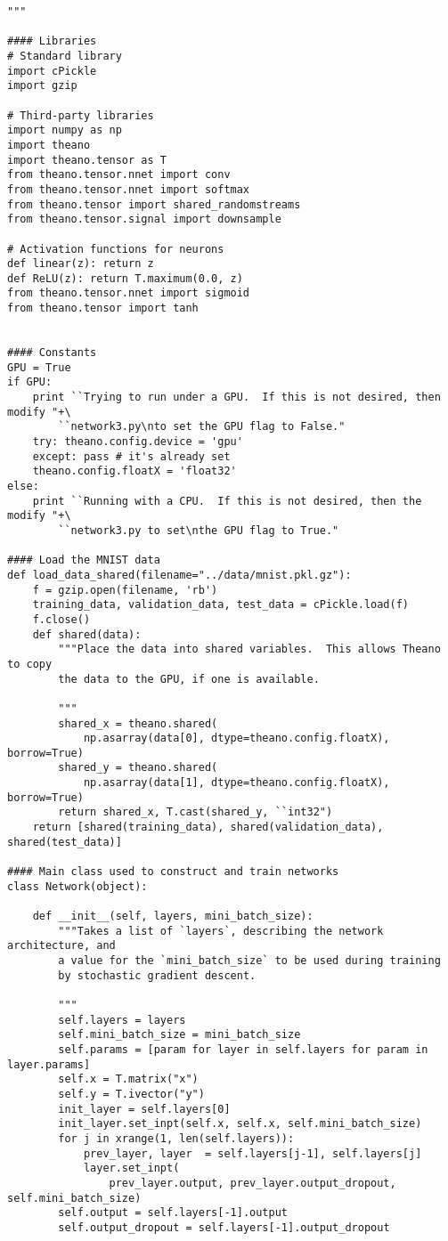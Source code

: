 \begin{lstlisting}
"""

#### Libraries
# Standard library
import cPickle
import gzip

# Third-party libraries
import numpy as np
import theano
import theano.tensor as T
from theano.tensor.nnet import conv
from theano.tensor.nnet import softmax
from theano.tensor import shared_randomstreams
from theano.tensor.signal import downsample

# Activation functions for neurons
def linear(z): return z
def ReLU(z): return T.maximum(0.0, z)
from theano.tensor.nnet import sigmoid
from theano.tensor import tanh


#### Constants
GPU = True
if GPU:
    print ``Trying to run under a GPU.  If this is not desired, then modify "+\
        ``network3.py\nto set the GPU flag to False."
    try: theano.config.device = 'gpu'
    except: pass # it's already set
    theano.config.floatX = 'float32'
else:
    print ``Running with a CPU.  If this is not desired, then the modify "+\
        ``network3.py to set\nthe GPU flag to True."

#### Load the MNIST data
def load_data_shared(filename="../data/mnist.pkl.gz"):
    f = gzip.open(filename, 'rb')
    training_data, validation_data, test_data = cPickle.load(f)
    f.close()
    def shared(data):
        """Place the data into shared variables.  This allows Theano to copy
        the data to the GPU, if one is available.

        """
        shared_x = theano.shared(
            np.asarray(data[0], dtype=theano.config.floatX), borrow=True)
        shared_y = theano.shared(
            np.asarray(data[1], dtype=theano.config.floatX), borrow=True)
        return shared_x, T.cast(shared_y, ``int32")
    return [shared(training_data), shared(validation_data), shared(test_data)]

#### Main class used to construct and train networks
class Network(object):

    def __init__(self, layers, mini_batch_size):
        """Takes a list of `layers`, describing the network architecture, and
        a value for the `mini_batch_size` to be used during training
        by stochastic gradient descent.

        """
        self.layers = layers
        self.mini_batch_size = mini_batch_size
        self.params = [param for layer in self.layers for param in layer.params]
        self.x = T.matrix("x")
        self.y = T.ivector("y")
        init_layer = self.layers[0]
        init_layer.set_inpt(self.x, self.x, self.mini_batch_size)
        for j in xrange(1, len(self.layers)):
            prev_layer, layer  = self.layers[j-1], self.layers[j]
            layer.set_inpt(
                prev_layer.output, prev_layer.output_dropout, self.mini_batch_size)
        self.output = self.layers[-1].output
        self.output_dropout = self.layers[-1].output_dropout


\end{lstlisting}
